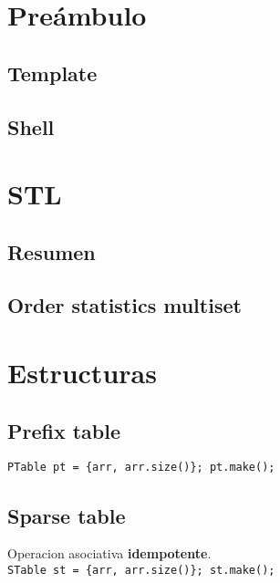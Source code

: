 

\def\title{Notebook}
\tableofcontents\newpage


\section{Preámbulo}
    \subsection{Template}
    \subsection{Shell}
        

\section{STL}
    \subsection{Resumen}
        
    \subsection{Order statistics multiset}

\section{Estructuras}
    \subsection{Prefix table}
        \texttt{PTable pt = \{arr, arr.size()\}; pt.make();}

    \subsection{Sparse table}
        Operacion asociativa \textbf{idempotente}. \\
        \texttt{STable st = \{arr, arr.size()\}; st.make();}

